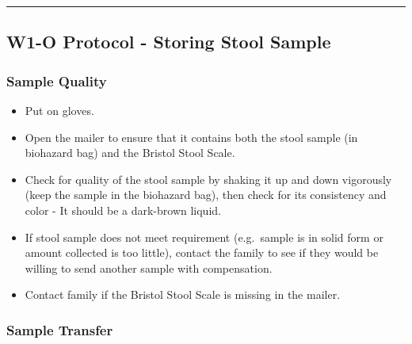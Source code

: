 \documentclass[
]{book}
\providecommand{\tightlist}{%
  \setlength{\itemsep}{0pt}\setlength{\parskip}{0pt}}
\begin{document}
\begin{center}\rule{0.5\linewidth}{0.5pt}\end{center}

\hypertarget{w1-o-protocol---storing-stool-sample}{%
\subsection{W1-O Protocol - Storing Stool Sample}\label{w1-o-protocol---storing-stool-sample}}

\hypertarget{sample-quality-1}{%
\subsubsection{Sample Quality}\label{sample-quality-1}}

\begin{itemize}
\tightlist
\item
  Put on gloves.
\item
  Open the mailer to ensure that it contains both the stool sample (in biohazard bag) and the Bristol Stool Scale.
\item
  Check for quality of the stool sample by shaking it up and down vigorously (keep the sample in the biohazard bag), then check for its consistency and color - It should be a dark-brown liquid.
\item
  If stool sample does not meet requirement (e.g.~sample is in solid form or amount collected is too little), contact the family to see if they would be willing to send another sample with compensation.
\item
  Contact family if the Bristol Stool Scale is missing in the mailer.
\end{itemize}

\hypertarget{sample-transfer-1}{%
\subsubsection{Sample Transfer}\label{sample-transfer-1}}
\end{document}
